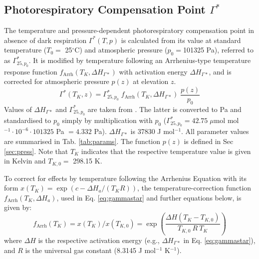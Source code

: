\documentclass{myreport}
\begin{document}
\subsection{Photorespiratory Compensation Point $\Gamma^\ast$}
\label{sec:gs}
The temperature and pressure-dependent photorespiratory compensation point in absence of dark respiration $\Gamma^\ast(T,p)$ is calculated from its value at standard temperature ($T_0=$ 25${^\circ}$C) and atmospheric pressure ($p_0 = $101325 Pa), referred to as $\Gamma^\ast_{25, p_0}$. It is modified by temperature following an Arrhenius-type temperature response function $f_{\text{Arrh}}(T_K, \Delta H_{\Gamma\ast})$ with activation energy $\Delta H_{\Gamma\ast}$, and is corrected for atmospheric pressure $p(z)$ at elevation $z$. 
\begin{equation}
\label{eq:gammastar}
    \Gamma^\ast (T_K, z) = \Gamma^\ast_{25, p_0} \; f_{\text{Arrh}}(T_K, \Delta H_{\Gamma\ast}) \; \frac{p(z)}{p_0}
\end{equation}
Values of $\Delta H_{\Gamma\ast}$ and $\Gamma^\ast_{25, p_0}$ are taken from \cite{bernacchi01}. The latter is converted to Pa and standardised to $p_0$ simply by multiplication with $p_0$ ($\Gamma^\ast_{25, p_0} = 42.75\; \mu$mol mol$^{-1} \cdot 10^{-6} \cdot 101325$ Pa $ = 4.332$ Pa). $\Delta H_{\Gamma\ast}$ is 37830 J mol$^{-1}$. All parameter values are summarised in Tab. \ref{tab:params}. The function $p(z)$ is defined in Sec \ref{sec:press}. Note that $T_K$ indicates that the respective temperature value is given in Kelvin and $T_{K,0}=$ 298.15 K.

To correct for effects by temperature following the Arrhenius Equation with its form $x(T_K)=\exp(c-\Delta H_a/(T_K R))$, the temperature-correction function $f_{\text{Arrh}}(T_K, \Delta H_a)$, used in Eq. \ref{eq:gammastar} and further equations below, is given by:
\begin{equation}
    f_{\text{Arrh}}(T_K) = x(T_K)/x(T_{K,0}) = \exp \left( \frac{\Delta H (T_K - T_{K,0})}{T_{K,0}\: R\: T_K} \right) 
\end{equation}
where $\Delta H$ is the respective activation energy (e.g., $\Delta H_{\Gamma\ast}$ in Eq. \ref{eq:gammastar}), and $R$ is the universal gas constant (8.3145 J mol$^{-1}$ K$^{-1}$).
\end{document}
